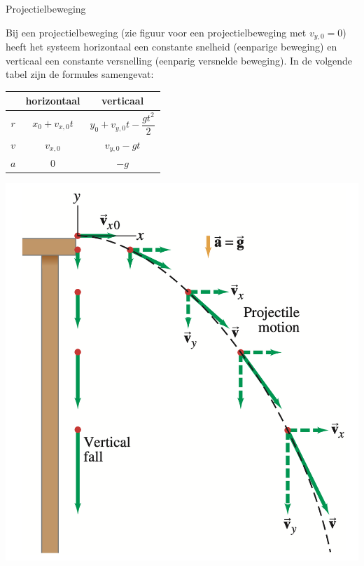 \begin{app}[Projectielbeweging]{Projectielbeweging}

    Bij een projectielbeweging (zie figuur voor een projectielbeweging met $ v_{y,0} = 0 $) heeft het systeem horizontaal een constante snelheid (eenparige beweging) en verticaal een constante versnelling (eenparig versnelde beweging). In de volgende tabel zijn de formules samengevat: 
    
    \begin{center}
        
    \begin{minipage}{.40\textwidth}
    
        \def\arraystretch{2.5}
        \begin{tabular}{c|c|c}
             & horizontaal & verticaal \\ \hline
             $ r $ & $ x_0 + v_{x,0}t $ & $ y_0 + v_{y,0}t - \dfrac{gt^2}{2} $ \\ \hline
             $ v $ & $ v_{x,0} $ & $ v_{y,0} - gt $  \\ \hline
             $ a $ & $ 0 $ & $ -g $ 
        \end{tabular}
        
    \end{minipage} 
    \begin{minipage}{.40\textwidth}
    
        \begin{center}
            \includegraphics[scale = 0.25]{Images/Kinematica/Projectielbeweging.png}
        \end{center}
    \end{minipage}
    

\end{center}
\end{app}
